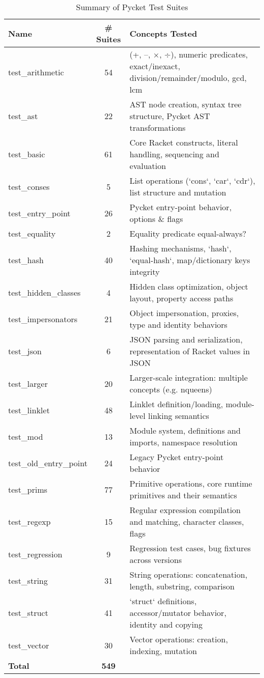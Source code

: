 \begin{table}[!h]
  \centering
  \begin{tabular}{lc>{\footnotesize}l}
    \textbf{Name} & \textbf{\# Suites} & {\normalsize\textbf{Concepts Tested}} \\
    \hline \hline
    test\_arithmetic        & 54  & (+, –, ×, ÷), numeric predicates, exact/inexact, division/remainder/modulo, gcd, lcm \\
    test\_ast               & 22  & AST node creation, syntax tree structure, Pycket AST transformations \\
    test\_basic             & 61  & Core Racket constructs, literal handling, sequencing and evaluation \\
    test\_conses            & 5   & List operations (`cons`, `car`, `cdr`), list structure and mutation \\
    test\_entry\_point      & 26  & Pycket entry-point behavior, options \& flags \\
    test\_equality          & 2   & Equality predicate equal-always? \\
    test\_hash              & 40  & Hashing mechanisms, `hash`, `equal-hash`, map/dictionary keys integrity \\
    test\_hidden\_classes   & 4   & Hidden class optimization, object layout, property access paths \\
    test\_impersonators     & 21  & Object impersonation, proxies, type and identity behaviors \\
    test\_json              & 6   & JSON parsing and serialization, representation of Racket values in JSON \\
    test\_larger            & 20  & Larger-scale integration: multiple concepts (e.g. nqueens) \\
    test\_linklet           & 48  & Linklet definition/loading, module-level linking semantics \\
    test\_mod               & 13  & Module system, definitions and imports, namespace resolution \\
    test\_old\_entry\_point & 24  & Legacy Pycket entry-point behavior \\
    test\_prims             & 77  & Primitive operations, core runtime primitives and their semantics \\
    test\_regexp            & 15  & Regular expression compilation and matching, character classes, flags \\
    test\_regression        & 9   & Regression test cases, bug fixtures across versions \\
    test\_string            & 31  & String operations: concatenation, length, substring, comparison \\
    test\_struct            & 41  & `struct` definitions, accessor/mutator behavior, identity and copying \\
    test\_vector            & 30  & Vector operations: creation, indexing, mutation \\
    \hline
    \addlinespace[4pt]
    \textbf{Total} & \textbf{549} & \\
  \end{tabular}
  \caption{Summary of Pycket Test Suites}
  \label{table:validation-test-suites-table}
\end{table}
